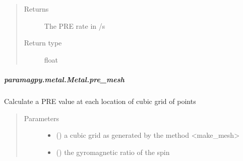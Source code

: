 \documentclass[a4paper,10pt,english]{sphinxmanual}
\begin{document}
\begin{fulllineitems}
\begin{fulllineitems}
\begin{fulllineitems}
\begin{quote}
\begin{description}
\begin{itemize}
\end{itemize}

\item[{Returns}] \leavevmode
{} \textendash{} The PRE rate in /s

\item[{Return type}] \leavevmode
float

\end{description}\end{quote}

\end{fulllineitems}



\subparagraph{paramagpy.metal.Metal.pre\_mesh}
\label{\detokenize{reference/generated/paramagpy.metal.Metal.pre_mesh:paramagpy-metal-metal-pre-mesh}}\label{\detokenize{reference/generated/paramagpy.metal.Metal.pre_mesh::doc}}

\begin{fulllineitems}
\label{\detokenize{reference/generated/paramagpy.metal.Metal.pre_mesh:paramagpy.metal.Metal.pre_mesh}}
Calculate a PRE value at each location of cubic grid of points
\begin{quote}\begin{description}
\item[{Parameters}] \leavevmode\begin{itemize}
\item {} 
 (\sphinxstyleliteralemphasis{\sphinxupquote{ (}}\sphinxstyleliteralemphasis{\sphinxupquote{,}}\sphinxstyleliteralemphasis{\sphinxupquote{,}}\sphinxstyleliteralemphasis{\sphinxupquote{,}}\sphinxstyleliteralemphasis{\sphinxupquote{)}}) \textendash{} a cubic grid as generated by the method \textless{}make\_mesh\textgreater{}

\item {} 
 () \textendash{} the gyromagnetic ratio of the spin


\end{itemize}
\end{description}
\end{quote}
\end{fulllineitems}
\end{fulllineitems}
\end{fulllineitems}
\end{document}
